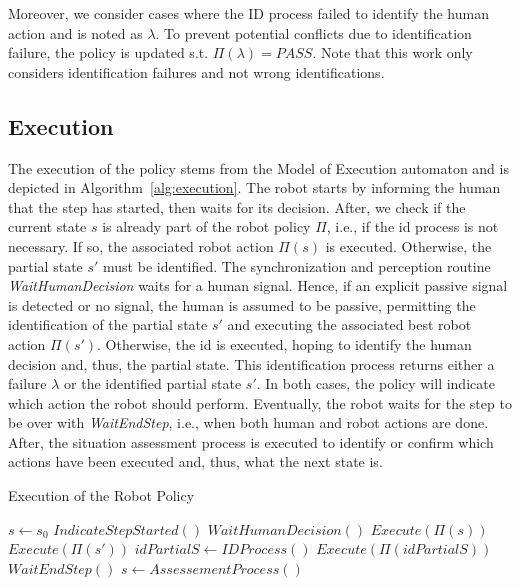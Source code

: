 Moreover, we consider cases where the ID process failed to identify the human action and is noted as $\lambda$. To prevent potential conflicts due to identification failure, the policy is updated s.t. $\Pi(\lambda) = PASS$.
Note that this work only considers identification failures and not wrong identifications. 


    \subsection{Execution}

The execution of the policy stems from the Model of Execution automaton and is depicted in Algorithm~\ref{alg:execution}. The robot starts by informing the human that the step has started, then waits for its decision. After, we check if the current state $s$ is already part of the robot policy $\Pi$, i.e., if the \acrshort{id} process is not necessary. If so, the associated robot action $\Pi(s)$ is executed. Otherwise, the partial state $s'$ must be identified. The synchronization and perception routine \textit{WaitHumanDecision} waits for a human signal. Hence, if an explicit passive signal is detected or no signal, the human is assumed to be passive, permitting the identification of the partial state $s'$ and executing the associated best robot action $\Pi(s')$. Otherwise, the \acrshort{id} is executed, hoping to identify the human decision and, thus, the partial state. This identification process returns either a failure $\lambda$ or the identified partial state $s'$. In both cases, the policy will indicate which action the robot should perform. 
Eventually, the robot waits for the step to be over with \textit{WaitEndStep}, i.e., when both human and robot actions are done. After, the situation assessment process is executed to identify or confirm which actions have been executed and, thus, what the next state is.

\begin{algorithm}
\caption{Execution of the Robot Policy }\label{alg:execution}
\begin{algorithmic}[1]

\State $s \gets s_0$ 
    \State $IndicateStepStarted()$ 
    \State $WaitHumanDecision()$
     
        \State $Execute(\Pi(s))$
    \Else
         
            \State $Execute(\Pi(s'))$
        \Else
            \State $idPartialS \gets IDProcess()$ 
            \State $Execute(\Pi(idPartialS))$
        \EndIf
    \EndIf
    \State $WaitEndStep()$ 
    \State $s \gets AssessementProcess()$ 
\EndWhile

\end{algorithmic}
\end{algorithm}

